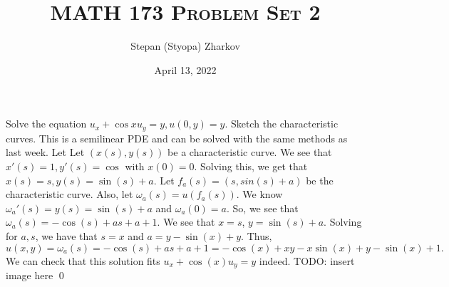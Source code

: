 \documentclass{article}
\title{\textsc{MATH 173 Problem Set 2}}
\author{Stepan (Styopa) Zharkov}
\date{April 13, 2022}
\begin{document}
\maketitle
{} Solve the equation $u_x+ \cos xu_y= y, u(0, y) = y$. Sketch the characteristic
curves. \tri
\hop
\solution
This is a semilinear PDE and can be solved with the same methods as last week. Let 
Let $(x(s), y(s))$ be a characteristic curve. We see that $x'(s) = 1, y'(s) = \cos$ with $x(0) = 0$. 
\hop
Solving this, we get that $x(s) = s, y(s) = \sin(s) + a$. Let $f_a(s) = (s, 
sin(s)+a)$ be the characteristic curve. Also, let $\omega_a(s) = u(f_a(s))$.  We know $\omega_a'(s) = y(s) = \sin(s) + a$ and $\omega_a(0) = a$. So, we see that $\omega_a(s) = -\cos(s)+as +a +1$. We see that $x= s$, $y= \sin(s)+a$. Solving for $a, s$, we have that $s =x$ and $a = y - \sin(x) + y$. Thus,
\[u(x,y) = \omega_a(s)=-\cos(s)+as +a +1 = -\cos(x)+xy - x\sin(x)+y-\sin(x)+1.\]
We can check that this solution fits $u_x +\cos(x)u_y = y$ indeed. 
\hop
TODO: insert image here
\qed
\end{document}
